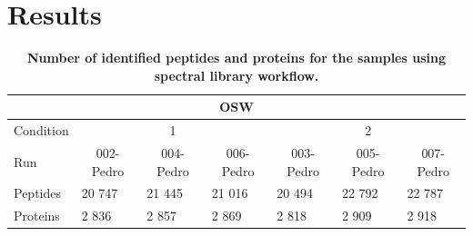 \documentclass[10pt,letterpaper]{article}
\begin{document}

\section*{Results}


\begin{table}[H]
\begin{tabular}{lllllll}
\hline
\multicolumn{7}{c}{OSW}                                                                                                                                                                                   \\ \hline
Condition & \multicolumn{3}{c}{1}                                                                         & \multicolumn{3}{c}{2}                                                                         \\
Run       & \multicolumn{1}{c}{002-Pedro} & \multicolumn{1}{c}{004-Pedro} & \multicolumn{1}{c}{006-Pedro} & \multicolumn{1}{c}{003-Pedro} & \multicolumn{1}{c}{005-Pedro} & \multicolumn{1}{c}{007-Pedro} \\
Peptides  & 20 747                        & 21 445                        & 21 016                        & 20 494                        & 22 792                        & 22 787                        \\
Proteins  & 2 836                         & 2 857                         & 2 869                         & 2 818                         & 2 909                         & 2 918                         \\ \hline
\end{tabular}
 \caption{{\bf Number of identified peptides and proteins for the samples using spectral library workflow.}
      \label{fig:osw_peptide_and_protein_id}}
\end{table}
\end{document}
